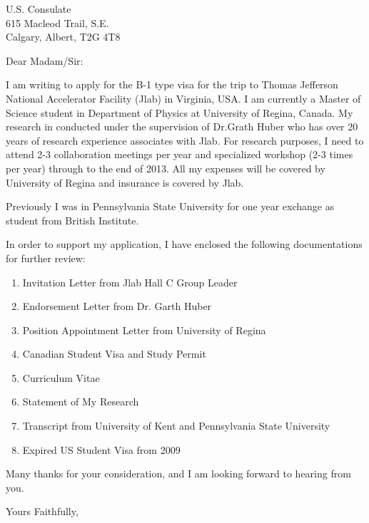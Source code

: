 \documentclass[12pt, letterpaper]{letter}
\begin{document}
 
\begin{letter}{U.S. Consulate\\ 615 Macleod Trail, S.E. \\ Calgary, Albert, T2G 4T8}

\opening{Dear Madam/Sir:}
I am writing to apply for the B-1 type visa for the trip to Thomas Jefferson National Accelerator Facility (Jlab) in Virginia, USA. I am currently a Master of Science student in Department of Physics at University of Regina, Canada. My research in conducted under the supervision of Dr.Grath Huber who has over 20 years of research experience associates with Jlab. For research purposes, I need to attend 2-3 collaboration meetings per year and specialized workshop (2-3 times per year) through to the end of 2013. All my expenses will be covered by University of Regina and insurance is covered by Jlab.

Previously I was in Pennsylvania State University for one year exchange as student from British Institute. 

In order to support my application, I have enclosed the following documentations for further review:
\vspace{-5mm}
\begin{enumerate}
	\item Invitation Letter from Jlab Hall C Group Leader
	\item Endorsement Letter from Dr. Garth Huber 
	\item Position Appointment Letter from University of Regina
	\item Canadian Student Visa and Study Permit
	\item Curriculum Vitae
	\item Statement of My Research
	\item Transcript from University of Kent and Pennsylvania State University
	\item Expired US Student Visa from 2009
\end{enumerate}
\vspace{-2mm}

Many thanks for your consideration, and I am looking forward to hearing from you.

\closing{Yours Faithfully,}
 
\end{letter}
\end{document}
